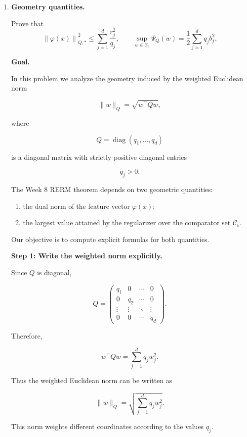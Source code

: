\documentclass[11pt]{article}
\newcommand{\norm}[1]{\left\lVert #1 \right\rVert}
\begin{document}
\begin{enumerate}

\item \textbf{Geometry quantities.}

Prove that
\[
\norm{\varphi(x)}_{Q,*}^2
\le
\sum_{j=1}^d\frac{r_j^2}{q_j},
\qquad
\sup_{w\in\mathcal C_b}\Psi_Q(w)
=
\frac12\sum_{j=1}^dq_jb_j^2.
\]

\begin{solutionbox}

\textbf{Goal.}

In this problem we analyze the geometry induced by the weighted Euclidean norm

\[
\|w\|_Q
=
\sqrt{w^\top Qw},
\]

where

\[
Q
=
\operatorname{diag}(q_1,\ldots,q_d)
\]

is a diagonal matrix with strictly positive diagonal entries

\[
q_j>0.
\]

The Week 8 RERM theorem depends on two geometric quantities:

\begin{enumerate}
    \item the dual norm of the feature vector \(\varphi(x)\);
    \item the largest value attained by the regularizer over the comparator set \(\mathcal C_b\).
\end{enumerate}

Our objective is to compute explicit formulas for both quantities.

\medskip

\textbf{Step 1: Write the weighted norm explicitly.}

Since \(Q\) is diagonal,

\[
Q
=
\begin{pmatrix}
q_1 & 0 & \cdots & 0 \\
0 & q_2 & \cdots & 0 \\
\vdots & \vdots & \ddots & \vdots \\
0 & 0 & \cdots & q_d
\end{pmatrix}.
\]

Therefore,

\[
w^\top Qw
=
\sum_{j=1}^{d}
q_j w_j^2.
\]

Thus the weighted Euclidean norm can be written as

\[
\boxed{
\|w\|_Q
=
\sqrt{
\sum_{j=1}^{d}
q_j w_j^2
}.
}
\]

This norm weights different coordinates according to the values \(q_j\).


\end{solutionbox}
\end{enumerate}
\end{document}
